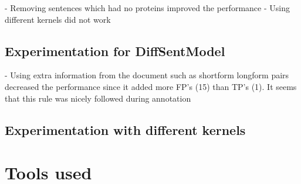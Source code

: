 - Removing sentences which had no proteins improved the performance
- Using different kernels did not work

\subsection{Experimentation for DiffSentModel}

- Using extra information from the document such as shortform longform pairs decreased the performance since it added more FP's (15) than TP's (1). It seems that this rule was nicely followed during annotation

\subsection{Experimentation with different kernels}

\section{Tools used}\label{sec:tools}
